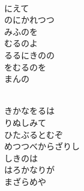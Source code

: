 \documentclass[10pt,b5j]{tarticle} %
\begin{document}
\begin{enumerate}
\begin{minipage}[c]{\blocksize}
    \end{minipage}
    \begin{minipage}[c]{\blocksize}
        
        \vspace{\linespace}
        \item~\\
        にえて\\
        のにかれつつ\\
        みふのを\\
        むるのよ\\
        るるにきのの\\
        をむるのを\\
        まんの
        
    \end{minipage}
    \begin{minipage}[c]{\blocksize}
        
        \vspace{\linespace}
        \item~\\
        きかなをるは\\
        りぬしみて\\
        ひたぶるとむぞ\\
        めつつべからざりし\\
        しきのは\\
        はろかなりが\\
        まざらめや
    
    \end{minipage}
\end{enumerate} %
\end{document}
